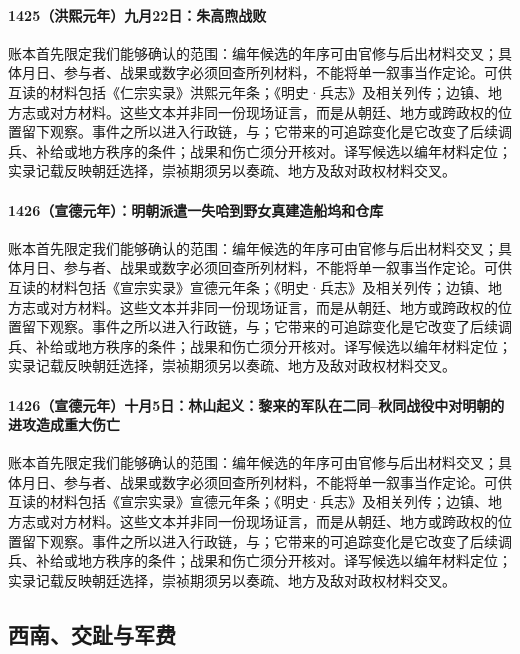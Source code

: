 \paragraph{1425（洪熙元年）九月22日：朱高煦战败} 账本首先限定我们能够确认的范围：编年候选的年序可由官修与后出材料交叉；具体月日、参与者、战果或数字必须回查所列材料，不能将单一叙事当作定论。可供互读的材料包括《仁宗实录》洪熙元年条；《明史·兵志》及相关列传；边镇、地方志或对方材料。这些文本并非同一份现场证言，而是从朝廷、地方或跨政权的位置留下观察。事件之所以进入行政链，与；它带来的可追踪变化是它改变了后续调兵、补给或地方秩序的条件；战果和伤亡须分开核对。译写候选以编年材料定位；实录记载反映朝廷选择，崇祯期须另以奏疏、地方及敌对政权材料交叉。

\paragraph{1426（宣德元年）：明朝派遣一失哈到野女真建造船坞和仓库} 账本首先限定我们能够确认的范围：编年候选的年序可由官修与后出材料交叉；具体月日、参与者、战果或数字必须回查所列材料，不能将单一叙事当作定论。可供互读的材料包括《宣宗实录》宣德元年条；《明史·兵志》及相关列传；边镇、地方志或对方材料。这些文本并非同一份现场证言，而是从朝廷、地方或跨政权的位置留下观察。事件之所以进入行政链，与；它带来的可追踪变化是它改变了后续调兵、补给或地方秩序的条件；战果和伤亡须分开核对。译写候选以编年材料定位；实录记载反映朝廷选择，崇祯期须另以奏疏、地方及敌对政权材料交叉。

\paragraph{1426（宣德元年）十月5日：林山起义：黎来的军队在二同–秋同战役中对明朝的进攻造成重大伤亡} 账本首先限定我们能够确认的范围：编年候选的年序可由官修与后出材料交叉；具体月日、参与者、战果或数字必须回查所列材料，不能将单一叙事当作定论。可供互读的材料包括《宣宗实录》宣德元年条；《明史·兵志》及相关列传；边镇、地方志或对方材料。这些文本并非同一份现场证言，而是从朝廷、地方或跨政权的位置留下观察。事件之所以进入行政链，与；它带来的可追踪变化是它改变了后续调兵、补给或地方秩序的条件；战果和伤亡须分开核对。译写候选以编年材料定位；实录记载反映朝廷选择，崇祯期须另以奏疏、地方及敌对政权材料交叉。

\subsection{西南、交趾与军费}

